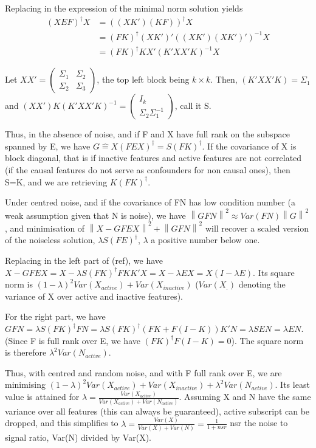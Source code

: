 \documentclass{article}
\begin{document}
Replacing in the expression of the minimal norm solution yields
\begin{equation}
\begin{aligned}
(XEF)^\dagger X&=((XK')(KF))^\dagger X\\
&=(FK)^\dagger (XK')'((XK')(XK')')^{-1} X\\
&=(FK)^\dagger KX' (K'XX'K)^{-1} X
\end{aligned}
\end{equation}

Let $XX' = \left(\begin{array}{c|c}\Sigma_{1} & \Sigma_{2} \\\hline \Sigma_{2} & \Sigma_{3}\end{array}\right)$, the top left block being $k\times k$. Then, $(K'XX'K)=\Sigma_{1}$ and $(XX')K(K'XX'K)^{-1}=\left(\begin{array}{c}I_{k} \\\hline \Sigma_{2} \Sigma_{1}^{-1}\end{array}\right)$, call it S.

Thus, in the absence of noise, and if F and X have full rank on the subspace spanned by E, we have $G\hat=X(FEX)^\dagger =S (FK)^\dagger$. If the covariance of X is block diagonal, that is if inactive features and active features are not correlated (if the causal features do not serve as confounders for non causal ones), then S=K, and we are retrieving $K (FK)^\dagger$.

Under centred noise, and if the covariance of FN has low condition number (a weak assumption given that N is noise), we have $\left \| GFN\right \| ^2 \approx Var(FN) \left \| G\right \| ^2$, and minimisation of $\left \| X-GFEX\right\| ^2  + \left \| GFN\right \| ^2$ will recover a scaled version of the noiseless solution, $\lambda S (FE)^\dagger$, $\lambda$ a positive number below one.

Replacing in the left part of (ref), we have $X-GFEX=X- \lambda S (FK)^\dagger FKK'X= X - \lambda EX=X(I-\lambda E)$. Its square norm is $(1-\lambda)^2 Var(X_{active}) + Var(X_{inactive})$ ($Var(X_{.})$ denoting the variance of X over active and inactive features).

For the right part, we have $GFN=\lambda S (FK)^\dagger FN= \lambda S (FK)^\dagger (FK+F(I-K))K'N= \lambda S EN=  \lambda EN$. (Since F is full rank over E, we have $(FK)^\dagger F(I-K)= 0$). The square norm is therefore $\lambda^2 Var(N_{active})$.

Thus, with centred and random noise, and with F full rank over E, we are minimising $(1-\lambda)^2 Var(X_{active}) + Var(X_{inactive})+\lambda^2 Var(N_{active})$. Its least value is attained for $\lambda = \frac{Var(X_{active})}{Var(X_{active})+Var(N_{active})}$. Assuming X and N have the same variance over all features (this can always be guaranteed), active subscript can be dropped, and this simplifies to $\lambda= \frac {Var(X)}{Var(X)+ Var(N)}=\frac{1}{1+nsr}$ nsr the noise to signal ratio, Var(N) divided by Var(X).
\end{document}
